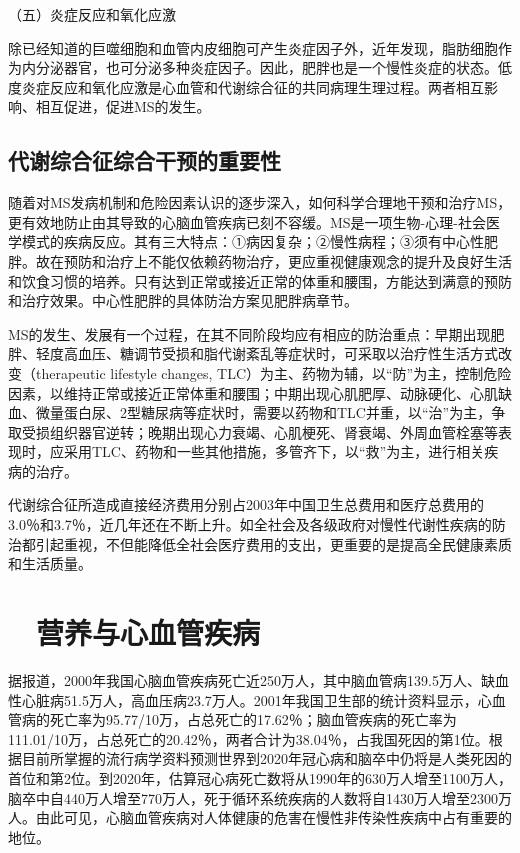 （五）炎症反应和氧化应激

除已经知道的巨噬细胞和血管内皮细胞可产生炎症因子外，近年发现，脂肪细胞作为内分泌器官，也可分泌多种炎症因子。因此，肥胖也是一个慢性炎症的状态。低度炎症反应和氧化应激是心血管和代谢综合征的共同病理生理过程。两者相互影响、相互促进，促进MS的发生。

\hypertarget{text00004.htmlux5cux23mllj5}{%
\subsection{代谢综合征综合干预的重要性}\label{text00004.htmlux5cux23mllj5}}

随着对MS发病机制和危险因素认识的逐步深入，如何科学合理地干预和治疗MS，更有效地防止由其导致的心脑血管疾病已刻不容缓。MS是一项生物-心理-社会医学模式的疾病反应。其有三大特点：①病因复杂；②慢性病程；③须有中心性肥胖。故在预防和治疗上不能仅依赖药物治疗，更应重视健康观念的提升及良好生活和饮食习惯的培养。只有达到正常或接近正常的体重和腰围，方能达到满意的预防和治疗效果。中心性肥胖的具体防治方案见肥胖病章节。

MS的发生、发展有一个过程，在其不同阶段均应有相应的防治重点：早期出现肥胖、轻度高血压、糖调节受损和脂代谢紊乱等症状时，可采取以治疗性生活方式改变（therapeutic
lifestyle changes,
TLC）为主、药物为辅，以“防”为主，控制危险因素，以维持正常或接近正常体重和腰围；中期出现心肌肥厚、动脉硬化、心肌缺血、微量蛋白尿、2型糖尿病等症状时，需要以药物和TLC并重，以“治”为主，争取受损组织器官逆转；晚期出现心力衰竭、心肌梗死、肾衰竭、外周血管栓塞等表现时，应采用TLC、药物和一些其他措施，多管齐下，以“救”为主，进行相关疾病的治疗。

代谢综合征所造成直接经济费用分别占2003年中国卫生总费用和医疗总费用的3.0％和3.7％，近几年还在不断上升。如全社会及各级政府对慢性代谢性疾病的防治都引起重视，不但能降低全社会医疗费用的支出，更重要的是提高全民健康素质和生活质量。

\hypertarget{text00004.htmlux5cux23mllj6}{%
\section{　营养与心血管疾病}\label{text00004.htmlux5cux23mllj6}}

据报道，2000年我国心脑血管疾病死亡近250万人，其中脑血管病139.5万人、缺血性心脏病51.5万人，高血压病23.7万人。2001年我国卫生部的统计资料显示，心血管病的死亡率为95.77/10万，占总死亡的17.62％；脑血管疾病的死亡率为111.01/10万，占总死亡的20.42％，两者合计为38.04％，占我国死因的第1位。根据目前所掌握的流行病学资料预测世界到2020年冠心病和脑卒中仍将是人类死因的首位和第2位。到2020年，估算冠心病死亡数将从1990年的630万人增至1100万人，脑卒中自440万人增至770万人，死于循环系统疾病的人数将自1430万人增至2300万人。由此可见，心脑血管疾病对人体健康的危害在慢性非传染性疾病中占有重要的地位。

